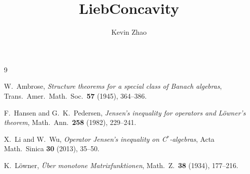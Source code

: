 \documentclass[a4paper]{report}
\title{LiebConcavity}
\author{Kevin Zhao}
\begin{document}
\maketitle


\begin{thebibliography}{9}

W.~Ambrose,
\emph{Structure theorems for a special class of Banach algebras},
Trans.\ Amer.\ Math.\ Soc.\ \textbf{57} (1945), 364--386.

F.~Hansen and G.~K.~Pedersen,
\emph{Jensen's inequality for operators and L\"{o}wner's theorem},
Math.\ Ann.\ \textbf{258} (1982), 229--241.

X.~Li and W.~Wu,
\emph{Operator Jensen's inequality on C$^*$-algebras},
Acta Math.\ Sinica \textbf{30} (2013), 35--50.

K.~L\"{o}wner,
\emph{\"{U}ber monotone Matrixfunktionen},
Math.\ Z.\ \textbf{38} (1934), 177--216.

\end{thebibliography}
\end{document}
